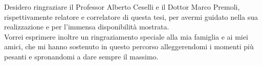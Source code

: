 \documentclass[12pt,italian]{report}
\numberwithin{equation}{section}    %
\begin{document}
\frontespizio
\beforepreface

%
%

Desidero ringraziare il Professor Alberto Ceselli e il Dottor Marco Premoli, rispettivamente relatore e correlatore di questa tesi, per avermi guidato nella sua realizzazione e per l'immensa disponibilità mostrata.\\
Vorrei esprimere inoltre un ringraziamento speciale alla mia famiglia e ai miei amici, che mi hanno sostenuto in questo percorso alleggerendomi i momenti più pesanti e spronandomi a dare sempre il massimo.

%
%

\afterpreface

% 
% 








%
%

\begin{appendices}
    
\end{appendices}

%
%





\end{document}
